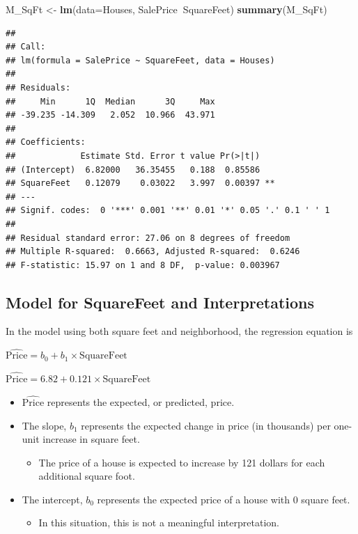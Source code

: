 \documentclass[]{book}
\newenvironment{Shaded}{\begin{snugshade}}{\end{snugshade}}
\newcommand{\KeywordTok}[1]{\textcolor[rgb]{0.13,0.29,0.53}{\textbf{#1}}}
\newcommand{\DataTypeTok}[1]{\textcolor[rgb]{0.13,0.29,0.53}{#1}}
\newcommand{\StringTok}[1]{\textcolor[rgb]{0.31,0.60,0.02}{#1}}
\newcommand{\OperatorTok}[1]{\textcolor[rgb]{0.81,0.36,0.00}{\textbf{#1}}}
\newcommand{\NormalTok}[1]{#1}
\providecommand{\tightlist}{%
  \setlength{\itemsep}{0pt}\setlength{\parskip}{0pt}}
\begin{document}
\begin{Shaded}
\begin{Highlighting}[]
\NormalTok{M_SqFt <-}\StringTok{ }\KeywordTok{lm}\NormalTok{(}\DataTypeTok{data=}\NormalTok{Houses, SalePrice}\OperatorTok{~}\NormalTok{SquareFeet) }
\KeywordTok{summary}\NormalTok{(M_SqFt)}
\end{Highlighting}
\end{Shaded}

\begin{verbatim}
## 
## Call:
## lm(formula = SalePrice ~ SquareFeet, data = Houses)
## 
## Residuals:
##     Min      1Q  Median      3Q     Max 
## -39.235 -14.309   2.052  10.966  43.971 
## 
## Coefficients:
##             Estimate Std. Error t value Pr(>|t|)   
## (Intercept)  6.82000   36.35455   0.188  0.85586   
## SquareFeet   0.12079    0.03022   3.997  0.00397 **
## ---
## Signif. codes:  0 '***' 0.001 '**' 0.01 '*' 0.05 '.' 0.1 ' ' 1
## 
## Residual standard error: 27.06 on 8 degrees of freedom
## Multiple R-squared:  0.6663, Adjusted R-squared:  0.6246 
## F-statistic: 15.97 on 1 and 8 DF,  p-value: 0.003967
\end{verbatim}

\subsection{Model for SquareFeet and
Interpretations}\label{model-for-squarefeet-and-interpretations}

In the model using both square feet and neighborhood, the regression
equation is

\(\widehat{\text{Price}}= b_0+ b_1 \times\text{SquareFeet}\)

\(\widehat{\text{Price}}= 6.82+ 0.121 \times\text{SquareFeet}\)

\begin{itemize}
\item
  \(\widehat{\text{Price}}\) represents the expected, or predicted,
  price.
\item
  The slope, \(b_1\) represents the expected change in price (in
  thousands) per one-unit increase in square feet.

  \begin{itemize}
  \tightlist
  \item
    The price of a house is expected to increase by 121 dollars for each
    additional square foot.
  \end{itemize}
\item
  The intercept, \(b_0\) represents the expected price of a house with 0
  square feet.

  \begin{itemize}
  \tightlist
  \item
    In this situation, this is not a meaningful interpretation.
  \end{itemize}
\end{itemize}
\end{document}
